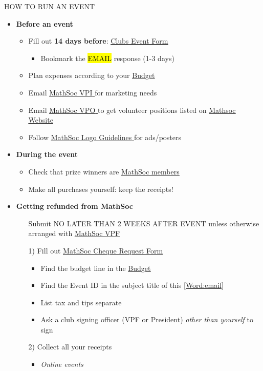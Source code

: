 \documentclass[utf8]{article}
\makeatletter
\newcommand{\budget}{\href{https://drive.google.com/file/d/1uQIh7Qp33NX0TgJhl3DdY-r2HqZzQKuZ/view}{\underline{Budget} }}
\newcommand{\setword}[2]{%
  \phantomsection
  #1\def\@currentlabel{\unexpanded{#1}}\label{#2}%
}
\newcommand{\MathSocVPF}{\href{mailto:vpf@mathsoc.uwaterloo.ca}{\underline{MathSoc VPF} }}
\newcommand{\MathSocVPI}{\href{mailto:vpi@mathsoc.uwaterloo.ca}{\underline{MathSoc VPI} }}
\newcommand{\MathSocVPO}{\href{mailto:vpo@mathsoc.uwaterloo.ca}{\underline{MathSoc VPO} }}
\newcommand{\clubsEventForm}{\href{https://wusa.ca/clubs/clubs-important-forms/clubs-event-form/done?sid=41744&token=1a166c8e45c6113b0322bd3e34fa6fb4}{\underline{Clubs Event Form} }}
\newcommand{\chequeReimbursementForm}{\href{https://mathsoc.uwaterloo.ca/wp-content/uploads/2021/02/Club-Cheque-Request-Form.pdf}{\underline{MathSoc Cheque Request Form} }}
\newcommand{\mathsocsite}{\href{https://mathsoc.uwaterloo.ca/}{\underline{Mathsoc Website} }}
\newcommand{\mathsoclogo}{\href{https://drive.google.com/drive/folders/18v8yaagA74DqMqXaffVm3BGyS8Ze9e5m}{\underline{MathSoc Logo Guidelines} }}
\newcommand{\membership}{\hyperref[sec:membership]{\underline{MathSoc members}}}
\makeatother
\begin{document}
{\Large HOW TO RUN AN EVENT}
\begin{itemize}
    \item \textbf{Before an event}
    \begin{itemize}
        \item Fill out \textbf{14 days before}: \clubsEventForm
        \begin{itemize}
            \item Bookmark the \setword{\hl{EMAIL}}{Word:email} response (1-3 days)
        \end{itemize}
        \item Plan expenses according to your \budget
        \item Email \MathSocVPI for marketing needs
        \item Email \MathSocVPO to get volunteer positions listed on \mathsocsite
        \item Follow \mathsoclogo for ads/posters
    \end{itemize}
    \item \textbf{During the event}
    \begin{itemize}
        \item Check that prize winners are \membership
        \item Make all purchases yourself: keep the receipts!
    \end{itemize}
    \item \textbf{Getting refunded from MathSoc}
    \begin{itemize}
        \item[\textbullet]Submit NO LATER THAN 2 WEEKS AFTER EVENT unless otherwise arranged with \MathSocVPF
        \item[1)] Fill out \chequeReimbursementForm
        \begin{itemize}
            \item Find the budget line in the \budget 
            \item Find the Event ID in the subject title of this \ref{Word:email}
            \item List tax and tips separate
            \item Ask a club signing officer (VPF or President) \textit{other than yourself} to sign 
        \end{itemize}
        \item[2)] Collect all your receipts
        \begin{itemize}
            \item \textit{Online events}

\end{itemize}
\end{itemize}
\end{itemize}
\end{document}
